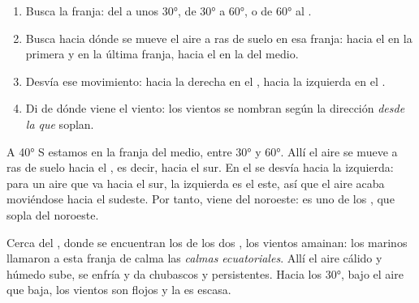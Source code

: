 \begin{method}\label{met:g8:winds-global-circulation:wind}
\begin{enumerate}
  \item Busca la franja: del  a unos \ang{30}, de \ang{30} a
        \ang{60}, o de \ang{60} al .
  \item Busca hacia dónde se mueve el aire a ras de suelo en esa franja:
        hacia el  en la primera y en la última franja, hacia el 
        en la del medio.
  \item Desvía ese movimiento: hacia la derecha en el ,
        hacia la izquierda en el .
  \item Di de dónde viene el viento: los vientos se nombran según la
        dirección \emph{desde la que} soplan.
\end{enumerate}
\end{method}

\begin{example}\label{ex:g8:winds-global-circulation:40s}
A \ang{40} S estamos en la franja del medio, entre \ang{30} y \ang{60}.
Allí el aire se mueve a ras de suelo hacia el , es decir, hacia el
sur. En el  se desvía hacia la izquierda: para un aire que
va hacia el sur, la izquierda es el este, así que el aire acaba moviéndose
hacia el sudeste. Por tanto, viene del noroeste: es uno de los , que sopla del noroeste.
\end{example}

Cerca del , donde se encuentran los  de los dos ,
los vientos amainan: los marinos llamaron a esta franja de calma las
\emph{calmas ecuatoriales}. Allí el aire cálido y húmedo sube, se enfría y
da chubascos y  persistentes. Hacia los \ang{30}, bajo el aire
que baja, los vientos son flojos y la  es escasa.

